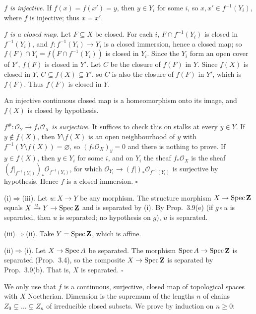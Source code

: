 \documentclass[11pt]{article}
\begin{document}
\emph{$f$ is injective.} If $f(x)=f(x')=y$, then $y\in Y_i$ for some $i$, so $x,x'\in f^{-1}(Y_i)$, where $f$ is injective; thus $x=x'$.

\emph{$f$ is a closed map.} Let $F\subseteq X$ be closed. For each $i$, $F\cap f^{-1}(Y_i)$ is closed in $f^{-1}(Y_i)$, and $f:f^{-1}(Y_i)\to Y_i$ is a closed immersion, hence a closed map; so $f(F)\cap Y_i=f(F\cap f^{-1}(Y_i))$ is closed in $Y_i$. Since the $Y_i$ form an open cover of $Y'$, $f(F)$ is closed in $Y'$. Let $C$ be the closure of $f(F)$ in $Y$. Since $f(X)$ is closed in $Y$, $C\subseteq f(X)\subseteq Y'$, so $C$ is also the closure of $f(F)$ in $Y'$, which is $f(F)$. Thus $f(F)$ is closed in $Y$.

An injective continuous closed map is a homeomorphism onto its image, and $f(X)$ is closed by hypothesis.

\emph{$f^\#:\mathcal O_Y\to f_*\mathcal O_X$ is surjective.} It suffices to check this on stalks at every $y\in Y$. If $y\notin f(X)$, then $Y\setminus f(X)$ is an open neighbourhood of $y$ with $f^{-1}(Y\setminus f(X))=\varnothing$, so $(f_*\mathcal O_X)_y=0$ and there is nothing to prove. If $y\in f(X)$, then $y\in Y_i$ for some $i$, and on $Y_i$ the sheaf $f_*\mathcal O_X$ is the sheaf $(f|_{f^{-1}(Y_i)})_*\mathcal O_{f^{-1}(Y_i)}$, for which $\mathcal O_{Y_i}\to(f|)_*\mathcal O_{f^{-1}(Y_i)}$ is surjective by hypothesis. Hence $f$ is a closed immersion. \hfill$\square$

\pf
(i)$\Rightarrow$(iii). Let $u:X\to Y$ be any morphism. The structure morphism $X\to\operatorname{Spec}\mathbf Z$ equals $X\xrightarrow{u}Y\to\operatorname{Spec}\mathbf Z$ and is separated by (i). By Prop.~3.9(e) (if $g\circ u$ is separated, then $u$ is separated; no hypothesis on $g$), $u$ is separated.

(iii)$\Rightarrow$(ii). Take $Y=\operatorname{Spec}\mathbf Z$, which is affine.

(ii)$\Rightarrow$(i). Let $X\to\operatorname{Spec} A$ be separated. The morphism $\operatorname{Spec} A\to\operatorname{Spec}\mathbf Z$ is separated (Prop.~3.4), so the composite $X\to\operatorname{Spec}\mathbf Z$ is separated by Prop.~3.9(b). That is, $X$ is separated. \hfill$\square$

\pf
We only use that $f$ is a continuous, surjective, closed map of topological spaces with $X$ Noetherian. Dimension is the supremum of the lengths $n$ of chains $Z_0\subsetneq\dots\subsetneq Z_n$ of irreducible closed subsets. We prove by induction on $n\ge0$:
\end{document}
